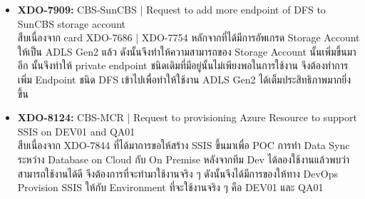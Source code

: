 \begin{itemize}
      \item \textbf{XDO-7909:} CBS-SunCBS | Request to add more endpoint of DFS to SunCBS storage account\\
            สืบเนื่องจาก card XDO-7686 | XDO-7754 หลักจากที่ได้มีการอัพเกรด Storage Account ให้เป็น ADLS Gen2 แล้ว ดังนั้นจึงทำให้ความสามารถของ Storage Account นั้นเพิ่มขึ้นมาอีก นั้นจึงทำให้ private endpoint ชนิดเดิมที่มีอยู่นั้นไม่เพียงพอในการใช้งาน จึงต้องทำการเพิ่ม Endpoint ชนิด DFS เข้าไปเพื่อทำให้ใช้งาน ADLS Gen2 ได้เต็มประสิทธิภาพมากยิ่งขึ้น
      \item \textbf{XDO-8124:} CBS-MCR | Request to provisioning Azure Resource to support SSIS on DEV01 and QA01\\
            สืบเนื่องจาก XDO-7844 ที่ได้มาการขอให้สร้าง SSIS ขึ้นมาเพื่อ POC การทำ Data Sync ระหว่าง Database on Cloud กับ On Premise หลังจากทีม Dev ได้ลองใช้งานแล้วพบว่าสามารถใช้งานได้ดี จึงต้องการที่จะทำมาใช้งานจริง ๆ ดังนั้นจึงได้มีการของให้ทาง DevOps Provision SSIS ให้กับ Environment ที่จะใช้งานจริง ๆ คือ DEV01 และ QA01
            
\end{itemize}

